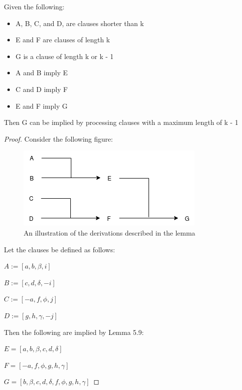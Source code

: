 \documentclass[manuscript]{acmart}
\begin{document}
    \begin{lemma}
        Given the following:
        \begin{itemize}
            \item A, B, C, and D, are clauses shorter than k
            \item E and F are clauses of length k
            \item G is a clause of length k or k - 1
            \item A and B imply E
            \item C and D imply F
            \item E and F imply G
        \end{itemize}
        Then G can be implied by processing clauses with a maximum length of k - 1
    \end{lemma}
    \begin{proof}
        Consider the following figure:

        \begin{figure}[h]
            \includegraphics[scale=0.8]{517a.png}
            \caption{An illustration of the derivations described in the lemma}
        \end{figure}

        Let the clauses be defined as follows:

        $A := [a, b, \beta, i]$

        $B := [c, d, \delta, -i]$
        
        $C := [-a, f, \phi, j]$
        
        $D := [g, h, \gamma, -j]$

        Then the following are implied by Lemma 5.9:

        $E = [a, b, \beta, c, d, \delta]$
        
        $F = [-a, f, \phi, g, h, \gamma]$
        
        $G = [b, \beta, c, d, \delta, f, \phi, g, h, \gamma]$
        

\end{proof}
\end{document}
